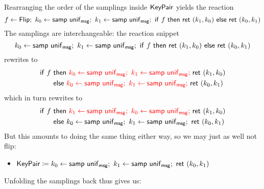 \noindent Rearranging the order of the samplings inside $\mathsf{KeyPair}$ yields the reaction
\[f \leftarrow \Flip; \ k_0 \leftarrow \samp{\unif_\msg}; \ k_1 \leftarrow \samp{\unif_\msg}; \ \ifte{f}{\ret{(k_1,k_0)}}{\ret{(k_0,k_1)}}\]
The samplings are interchangeable: the reaction snippet
\[k_0 \leftarrow \samp{\unif_\msg}; \ k_1 \leftarrow \samp{\unif_\msg}; \ \ifte{f}{\ret{(k_1,k_0)}}{\ret{(k_0,k_1)}}\]
rewrites to
\begin{align*}
\mathsf{if} \ f \ & \mathsf{then} \ {\color{red} k_0 \leftarrow \samp{\unif_\msg}; \ k_1 \leftarrow \samp{\unif_\msg};} \ \ret{(k_1,k_0)} \\& \mathsf{else} \ {\color{red} k_0 \leftarrow \samp{\unif_\msg}; \ k_1 \leftarrow \samp{\unif_\msg};} \ \ret{(k_0,k_1)}
\end{align*}
which in turn rewrites to
\begin{align*}
\mathsf{if} \ f \ & \mathsf{then} \ {\color{red} k_1 \leftarrow \samp{\unif_\msg}; \ k_0 \leftarrow \samp{\unif_\msg};} \ \ret{(k_1,k_0)} \\& \mathsf{else} \ k_0 \leftarrow \samp{\unif_\msg}; \ k_1 \leftarrow \samp{\unif_\msg}; \ \ret{(k_0,k_1)}
\end{align*}
But this amounts to doing the same thing either way, so we may just as well not flip:
\begin{itemize}
\item $\KeyPair \coloneqq k_0 \leftarrow \samp{\unif_\msg}; \ k_1 \leftarrow \samp{\unif_\msg}; \ \ret{(k_0,k_1)}$
\end{itemize}
Unfolding the samplings back thus gives us:

